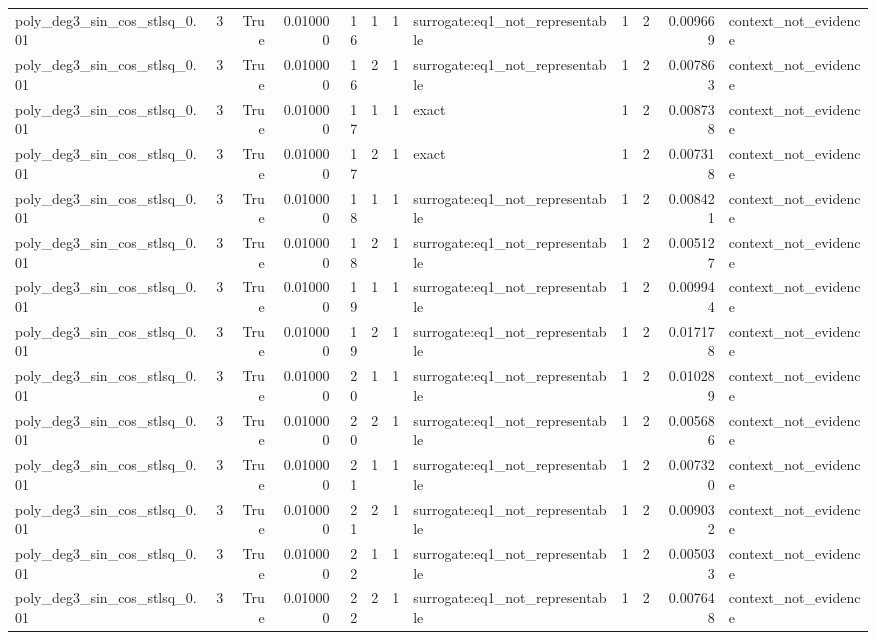 \begin{tabular}{lrrrrrrlrrrl}
poly\_deg3\_sin\_cos\_stlsq\_0.01 & 3 & True & 0.010000 & 16 & 1 & 1 & surrogate:eq1\_not\_representable & 1 & 2 & 0.009669 & context\_not\_evidence \\
poly\_deg3\_sin\_cos\_stlsq\_0.01 & 3 & True & 0.010000 & 16 & 2 & 1 & surrogate:eq1\_not\_representable & 1 & 2 & 0.007863 & context\_not\_evidence \\
poly\_deg3\_sin\_cos\_stlsq\_0.01 & 3 & True & 0.010000 & 17 & 1 & 1 & exact & 1 & 2 & 0.008738 & context\_not\_evidence \\
poly\_deg3\_sin\_cos\_stlsq\_0.01 & 3 & True & 0.010000 & 17 & 2 & 1 & exact & 1 & 2 & 0.007318 & context\_not\_evidence \\
poly\_deg3\_sin\_cos\_stlsq\_0.01 & 3 & True & 0.010000 & 18 & 1 & 1 & surrogate:eq1\_not\_representable & 1 & 2 & 0.008421 & context\_not\_evidence \\
poly\_deg3\_sin\_cos\_stlsq\_0.01 & 3 & True & 0.010000 & 18 & 2 & 1 & surrogate:eq1\_not\_representable & 1 & 2 & 0.005127 & context\_not\_evidence \\
poly\_deg3\_sin\_cos\_stlsq\_0.01 & 3 & True & 0.010000 & 19 & 1 & 1 & surrogate:eq1\_not\_representable & 1 & 2 & 0.009944 & context\_not\_evidence \\
poly\_deg3\_sin\_cos\_stlsq\_0.01 & 3 & True & 0.010000 & 19 & 2 & 1 & surrogate:eq1\_not\_representable & 1 & 2 & 0.017178 & context\_not\_evidence \\
poly\_deg3\_sin\_cos\_stlsq\_0.01 & 3 & True & 0.010000 & 20 & 1 & 1 & surrogate:eq1\_not\_representable & 1 & 2 & 0.010289 & context\_not\_evidence \\
poly\_deg3\_sin\_cos\_stlsq\_0.01 & 3 & True & 0.010000 & 20 & 2 & 1 & surrogate:eq1\_not\_representable & 1 & 2 & 0.005686 & context\_not\_evidence \\
poly\_deg3\_sin\_cos\_stlsq\_0.01 & 3 & True & 0.010000 & 21 & 1 & 1 & surrogate:eq1\_not\_representable & 1 & 2 & 0.007320 & context\_not\_evidence \\
poly\_deg3\_sin\_cos\_stlsq\_0.01 & 3 & True & 0.010000 & 21 & 2 & 1 & surrogate:eq1\_not\_representable & 1 & 2 & 0.009032 & context\_not\_evidence \\
poly\_deg3\_sin\_cos\_stlsq\_0.01 & 3 & True & 0.010000 & 22 & 1 & 1 & surrogate:eq1\_not\_representable & 1 & 2 & 0.005033 & context\_not\_evidence \\
poly\_deg3\_sin\_cos\_stlsq\_0.01 & 3 & True & 0.010000 & 22 & 2 & 1 & surrogate:eq1\_not\_representable & 1 & 2 & 0.007648 & context\_not\_evidence \\

\end{tabular}
